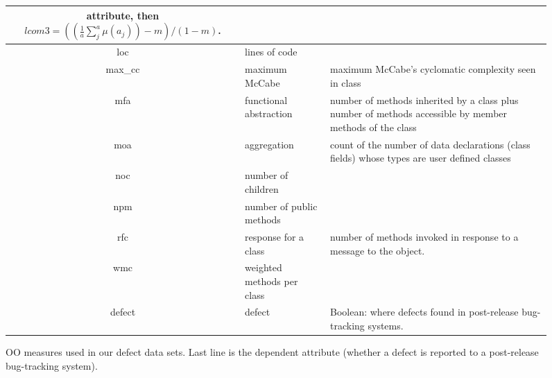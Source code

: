 \documentclass[12pt, journal, compsoc]{IEEEtran}
\begin{document}
\begin{figure*}[htbp!]
\begin{center}
{\begin{tabular}{c|l|p{4.7in}}
        attribute, 
        then
        $lcom3=((\frac{1}{a} \sum_j^a \mu(a_j)) - m)/ (1-m)$.
        \\\hline
        loc & lines of code &\\\hline
        max\_cc & maximum McCabe & maximum McCabe's cyclomatic complexity seen
        in class\\\hline
        mfa & functional abstraction & number of methods inherited by a class
        plus number of methods accessible by member methods of the
        class\\\hline
        moa &  aggregation &  count of the number of data declarations (class
        fields) whose types are user defined classes\\\hline
        noc &  number of children &\\\hline
        npm & number of public methods & \\\hline
        rfc & response for a class &number of  methods invoked in response to
        a message to the object.\\\hline
        wmc & weighted methods per class &\\\hline
        \rowcolor{lightgray}
        defect & defect & Boolean: where defects found in post-release bug-tracking systems.
      \end{tabular}
    }
  \end{center}
  \caption{OO measures used in our defect data sets.  Last line is
    the dependent attribute (whether a defect is reported to  a
    post-release bug-tracking system).}\label{fig:ck}
\end{figure*}
\end{document}
